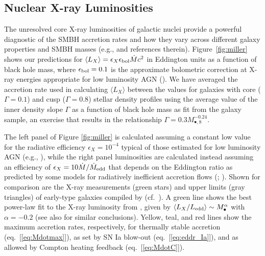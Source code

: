\documentclass[usenatbib,fleqn]{mn2e}
\newcommand{\Mbh}[1][]{M_{\bullet#1}}
\newcommand{\Mbheight}{M_{\bullet,8}}
\begin{document}
\subsection{Nuclear X-ray Luminosities}
\label{sec:Lx}

The unresolved core X-ray luminosities of galactic nuclei provide a
powerful diagnostic of the SMBH accretion rates and how they vary
across different galaxy properties and SMBH masses (e.g.,
\citealt{Ho08} and references therein).  Figure~\ref{fig:miller} shows
our predictions for $\langle L_{X} \rangle =\epsilon_X \epsilon_{\rm
  bol} \dot{M} c^2$ in Eddington units as a function of black hole
mass, where $\epsilon_{\rm bol} = 0.1$ is the approximate bolometric
correction at X-ray energies appropriate for low luminosity AGN
(\citealt{Ho08}).  We have averaged the accretion rate used in
calculating $\langle L_X \rangle$ between the values for galaxies with
core ($\Gamma = 0.1$) and cusp ($\Gamma = 0.8$) stellar density
profiles using the average value of the inner density slope $\Gamma$
as a function of black hole mass as fit from the
\citet{LauerFaber+:2007a} galaxy sample, an exercise that results in
the relationship $\Gamma = 0.3 \Mbheight^{-0.24}$. 

The left panel of Figure \ref{fig:miller} is calculated assuming a
constant low value for the radiative efficiency $\epsilon_X = 10^{-4}$
typical of those estimated for low luminosity AGN (e.g.,
\citealt{Ho:2009a}), while the right panel luminosities are calculated
instead assuming an efficiency of $\epsilon_X= 10 \dot{M}/\dot{M}_{\rm
  edd}$ that depends on the Eddington ratio as predicted by some
models for radiatively inefficient accretion flows
(\citealt{Narayan&Yi95}; \citealt{Narayan+98}).  Shown for comparison
are the X-ray measurements (green stars) and upper limits (gray
triangles) of early-type galaxies compiled by \citet{Miller+15}
(cf.~\citealt{Gallo+10}).  A green line shows the best power-law fit
to the X-ray luminosity from \citet{Miller+15}, given by $\langle
L_X/L_{\rm edd}\rangle \sim \Mbh^\alpha$ with $\alpha = -0.2$ (see also
\citep{Zhang+09, Pellegrini10, Gallo+10} for similar conclusions).
Yellow, teal, and red lines show the maximum accretion rates,
respectively, for thermally stable accretion (eq.~[\ref{eq:Mdotmax}]),
as set by SN Ia blow-out (eq.~[\ref{eq:eddr_Ia}]), and as allowed by
Compton heating feedback (eq.~[\ref{eq:MdotC}]).
\end{document}
